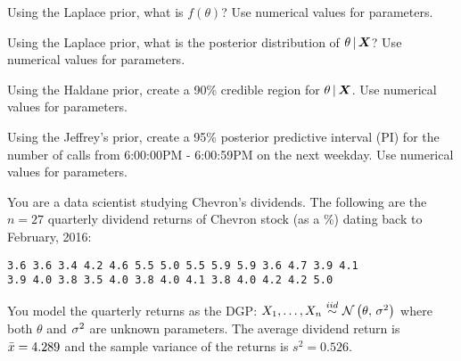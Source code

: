 \documentclass[12pt]{article}
\begin{document}
\begin{enumerate}[(a)]

 Using the Laplace prior, what is $f(\theta)$? Use numerical values for parameters.


 Using the Laplace prior, what is the posterior distribution of $\theta\,|\,\boldsymbol{X}$? Use numerical values for parameters.


 Using the Haldane prior, create a 90\% credible region for $\theta\,|\,\boldsymbol{X}$. Use numerical values for parameters.


 Using the Jeffrey's prior, create a 95\% posterior predictive interval (PI) for the number of calls from 6:00:00PM - 6:00:59PM on the next weekday. Use numerical values for parameters.


\end{enumerate}

\pagebreak

\problem You are a data scientist studying Chevron's dividends. The following are the $n=27$ quarterly dividend returns of Chevron stock (as a \%) dating back to February, 2016:

\begin{verbatim}
3.6 3.6 3.4 4.2 4.6 5.5 5.0 5.5 5.9 5.9 3.6 4.7 3.9 4.1 
3.9 4.0 3.8 3.5 4.0 3.8 4.0 4.1 3.8 4.0 4.2 4.2 5.0
\end{verbatim}

\noindent You model the quarterly returns as the DGP: $\Xoneton \iid \normnot{\theta}{\sigsq}$ where both $\theta$ and $\sigma^2$ are unknown parameters. The average dividend return is $\bar{x} = 4.289$ and the sample variance of the returns is $s^2 = 0.526$.
\end{document}
